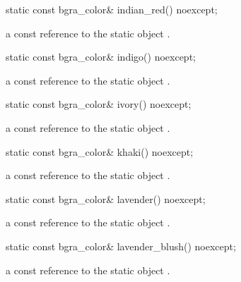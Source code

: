 \begin{itemdecl}
static const bgra_color& indian_red() noexcept;
\end{itemdecl}
\begin{itemdescr}
\pnum
\returns
a const reference to the static  object .
\end{itemdescr}

\begin{itemdecl}
static const bgra_color& indigo() noexcept;
\end{itemdecl}
\begin{itemdescr}
\pnum
\returns
a const reference to the static  object .
\end{itemdescr}

\begin{itemdecl}
static const bgra_color& ivory() noexcept;
\end{itemdecl}
\begin{itemdescr}
\pnum
\returns
a const reference to the static  object .
\end{itemdescr}

\begin{itemdecl}
static const bgra_color& khaki() noexcept;
\end{itemdecl}
\begin{itemdescr}
\pnum
\returns
a const reference to the static  object .
\end{itemdescr}

\begin{itemdecl}
static const bgra_color& lavender() noexcept;
\end{itemdecl}
\begin{itemdescr}
\pnum
\returns
a const reference to the static  object .
\end{itemdescr}

\begin{itemdecl}
static const bgra_color& lavender_blush() noexcept;
\end{itemdecl}
\begin{itemdescr}
\pnum
\returns
a const reference to the static  object .
\end{itemdescr}

